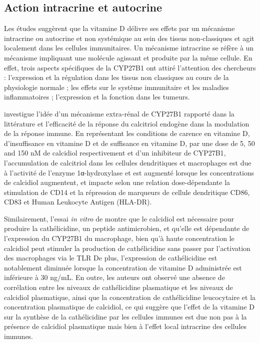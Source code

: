 \documentclass[
  a4paper,
  DIV=11,
  numbers=noendperiod,
  listof=totoc]{scrreprt}
\begin{document}
\subsection{Action intracrine et
autocrine}\label{action-intracrine-et-autocrine}

Les études suggèrent que la vitamine D délivre ses effets par un
mécanisme intracrine ou autocrine et non systémique au sein des tissus
non-classiques \autocite{Hewison.2007} et agit localement dans les
cellules immunitaires. Un mécanisme intracrine se réfère à un mécanisme
impliquant une molécule agissant et produite par la même cellule. En
effet, trois aspects spécifiques de la \ac{CYP27B1} ont attiré
l'attention des chercheurs : l'expression et la régulation dans les
tissus non classiques au cours de la physiologie normale ; les effets
sur le système immunitaire et les maladies inflammatoires ; l'expression
et la fonction dans les tumeurs.

\textcite{Hewison.2007} investigue l'idée d'un mécanisme extra-rénal de
\ac{CYP27B1} rapporté dans la littérature et l'efficacité de la réponse
du calcitriol endogène dans la modulation de la réponse immune. En
représentant les conditions de carence en vitamine D, d'insuffisance en
vitamine D et de suffisance en vitamine D, par une dose de 5, 50 and 150
nM de calcidiol respectivement et d'un inhibiteur de \ac{CYP27B1},
l'accumulation de calcitriol dans les cellules dendritiques et
macrophages est due à l'activité de l'enzyme 1α-hydroxylase et est
augmenté lorsque les concentrations de calcidiol augmentent, et impacte
selon une relation dose-dépendante la stimulation de \ac{CD}14 et la
répression de marqueurs de cellule dendritique \ac{CD}86, \ac{CD}83 et
Human Leukocyte Antigen (HLA-DR).

Similairement, l'essai \emph{in vitro} de \textcite{Adams.2009} montre
que le calcidiol est nécessaire pour produire la cathélicidine, un
peptide antimicrobien, et qu'elle est dépendante de l'expression du
\ac{CYP27B1} du macrophage, bien qu'à haute concentration le calcidiol
peut stimuler la production de cathélicidine sans passer par
l'activation des macrophages via le \ac{TLR} De plus, l'expression de
cathélicidine est notablement diminuée lorsque la concentration de
vitamine D administrée est inférieure à 30 ng/mL. En outre, les auteurs
ont observé une absence de corrélation entre les niveaux de
cathélicidine plasmatique et les niveaux de calcidiol plasmatique, ainsi
que la concentration de cathélicidine leucocytaire et la concentration
plasmatique de calcidiol, ce qui suggère que l'effet de la vitamine D
sur la synthèse de la cathélicidine par les cellules immunes est due non
pas à la présence de calcidiol plasmatique mais bien à l'effet local
intracrine des cellules immunes.
\end{document}
